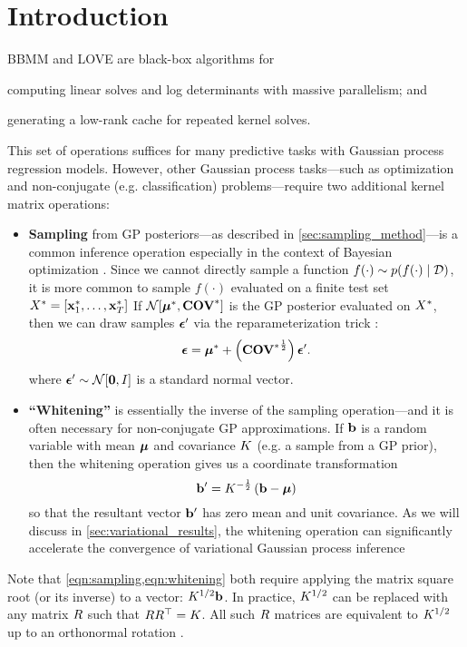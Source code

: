 \section{Introduction}

BBMM and LOVE are black-box algorithms for
%
\begin{enumerate*}
  \item computing linear solves and log determinants with massive parallelism; and
  \item generating a low-rank cache for repeated kernel solves.
\end{enumerate*}
%
This set of operations suffices for many predictive tasks with Gaussian process regression models.
However, other Gaussian process tasks---such as optimization and non-conjugate (e.g. classification) problems---require two additional kernel matrix operations:
\begin{itemize}
  \item {\bf Sampling} from GP posteriors---as described in \cref{sec:sampling_method}---is a common inference operation especially in the context of Bayesian optimization \cite{thompson1933likelihood,frazier2009knowledge,wang2017max}.
  Since we cannot directly sample a function $f(\cdot) \sim p(f(\cdot) \mid \mathcal D)$, it is more common to sample $f(\cdot)$ evaluated on a finite test set $X^* = [\mathbf{x}^*_1, \ldots, \mathbf{x}^*_T]$
  If $\normaldist{\bmeantest}{\Covtest}$ is the GP posterior evaluated on $X^*$, then we can draw samples $\boldsymbol{\epsilon}'$ via the reparameterization trick \cite{kingma2014auto,rezende2014stochastic}:
  \begin{equation}
    \boldsymbol{\epsilon} = \boldsymbol{\mu}^* + \left( {\textbf{COV}^*}^{\frac 1 2} \right) \boldsymbol{\epsilon}'.
    \label{eqn:sampling}
  \end{equation}
  where $\bepsilon' \sim \normaldist{\bzero}{\bI}$ is a standard normal vector.

  \item {\bf ``Whitening''} is essentially the inverse of the sampling operation---and it is often necessary for non-conjugate GP approximations.
  If $\mathbf{b}$ is a random variable with mean $\boldsymbol{\mu}$ and covariance $K$ (e.g. a sample from a GP prior), then the whitening operation gives us a coordinate transformation
  \begin{equation}
    \mathbf{b}' = K^{- \frac 1 2} \left( \mathbf{b} - \boldsymbol{\mu} \right)
    \label{eqn:whitening}
  \end{equation}
  so that the resultant vector $\mathbf{b}'$ has zero mean and unit covariance.
  As we will discuss in \cref{sec:variational_results}, the whitening operation can significantly accelerate the convergence of variational Gaussian process inference \cite{kuss2005assessing,hensman2013gaussian,matthews2017scalable}
\end{itemize}
%
Note that \cref{eqn:sampling,eqn:whitening} both require applying the matrix square root (or its inverse) to a vector: $K^{1/2} \mathbf{b}$.
In practice, $K^{1/2}$ can be replaced with any matrix $R$ such that $R R^\top = K$.
All such $R$ matrices are equivalent to $K^{1/2}$ up to an orthonormal rotation \cite{golub2012matrix}.

